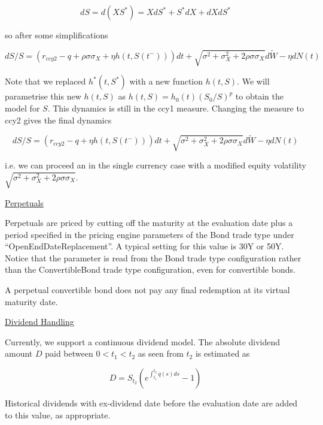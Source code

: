 \begin{equation}
  dS = d(XS^*) = XdS^* + S^*dX + dXdS^*
\end{equation}

so after some simplifications

\begin{equation}
  dS / S = (r_{ccy2} - q + \rho \sigma \sigma_X + \eta h(t, S(t^-))) dt + \sqrt{\sigma^2 + \sigma_X^2 + 2
    \rho\sigma\sigma_X} d\tilde{W} - \eta dN(t)
\end{equation}

Note that we replaced $h^*(t,S^*)$ with a new function $h(t,S)$. We will parametrise this new $h(t,S)$ as
$ h(t,S) = h_0(t) (S_0/S)^p$ to obtain the model for $S$. This dynamics is still in the ccy1 measure. Changing the
measure to ccy2 gives the final dynamics

\begin{equation}\label{formula:convertible_bond_xccy_dynamics}
  dS / S = (r_{ccy2} - q + \eta h(t, S(t^-))) dt + \sqrt{\sigma^2 + \sigma_X^2 + 2\rho\sigma\sigma_X} d\tilde{W} - \eta dN(t)
\end{equation}

i.e. we can proceed an in the single currency case with a modified equity volatility
$\sqrt{\sigma^2 + \sigma_X^2 + 2\rho\sigma\sigma_X}$.

\underline{Perpetuals}

Perpetuals are priced by cutting off the maturity at the evaluation date plus a period specified in the pricing engine
parameters of the Bond trade type under ``OpenEndDateReplacement''. A typical setting for this value is 30Y or
50Y. Notice that the parameter is read from the Bond trade type configuration rather than the ConvertibleBond trade type
configuration, even for convertible bonds.

A perpetual convertible bond does not pay any final redemption at its virtual maturity date.

\underline{Dividend Handling}

Currently, we support a continuous dividend model. The absolute dividend amount $D$ paid between $0<t_1<t_2$ as seen
from $t_2$ is estimated as

\begin{equation}
  D = S_{t_2} \left( e^{\int_{t_1}^{t_2} q(s) ds} - 1 \right)
\end{equation}

Historical dividends with ex-dividend date before the evaluation date are added to this value, as appropriate.

